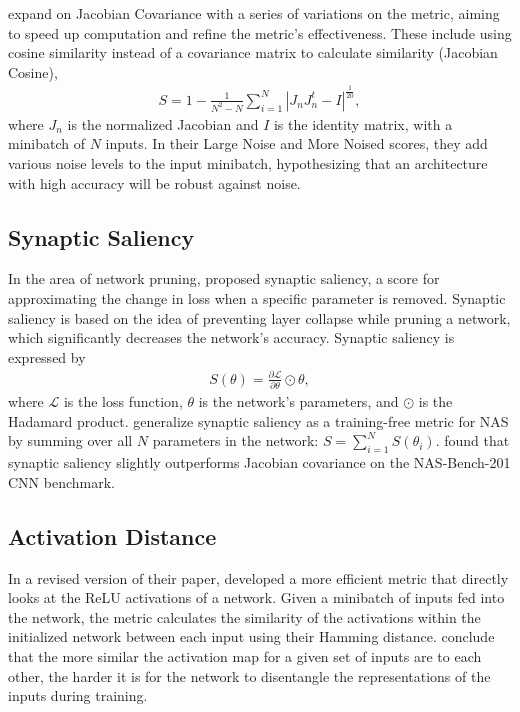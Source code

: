 \documentclass[11pt]{article}
\begin{document}
    \citet{celotti_improving_2020} expand on Jacobian Covariance with a series of variations on the metric, aiming to speed up computation and refine the metric's effectiveness. These include using cosine similarity instead of a covariance matrix to calculate similarity (Jacobian Cosine), 
    \begin{align*}
        S = 1 - \frac{1}{N^2-N}\sum_{i=1}^N\left|J_nJ_n^t - I\right|^{\frac{1}{20}},
    \end{align*}
    where $J_n$ is the normalized Jacobian and $I$ is the identity matrix, with a minibatch of $N$ inputs. In their Large Noise and More Noised scores, they add various noise levels to the input minibatch, hypothesizing that an architecture with high accuracy will be robust against noise.

\subsection{Synaptic Saliency}
    In the area of network pruning, \citet{tanaka_pruning_2020} proposed synaptic saliency, a score for approximating the change in loss when a specific parameter is removed. Synaptic saliency is based on the idea of preventing  layer collapse while pruning a network, which significantly decreases the network's accuracy. Synaptic saliency is expressed by
    \begin{align}
        S(\theta) = \frac{\partial\mathcal{L}}{\partial\theta} \odot \theta,
    \end{align}
    where $\mathcal{L}$ is the loss function, $\theta$ is the network's parameters, and $\odot$ is the Hadamard product. \citet{abdelfattah_zero-cost_2020} generalize synaptic saliency as a training-free metric for NAS by summing over all $N$ parameters in the network: $S = \sum_{i=1}^N S(\theta_i)$. \citet{abdelfattah_zero-cost_2020} found that synaptic saliency slightly outperforms Jacobian covariance on the NAS-Bench-201 CNN benchmark.

\subsection{Activation Distance}
    In a revised version of their paper, \citet{mellor_neural_2021} developed a more efficient metric that directly looks at the ReLU activations of a network. Given a minibatch of inputs fed into the network, the metric calculates the similarity of the activations within the initialized network between each input using their Hamming distance. \citeauthor{mellor_neural_2021} conclude that the more similar the activation map for a given set of inputs are to each other, the harder it is for the network to disentangle the representations of the inputs during training.
\end{document}
